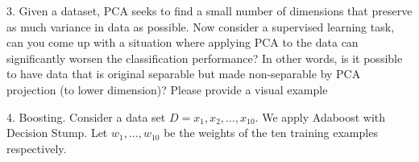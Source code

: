 \documentclass[12pt,letterpaper]{article}
\begin{document}
	\pagebreak
	\item[3.] Given a dataset, PCA seeks to find a small number of dimensions that preserve as much variance in data as possible. Now consider a supervised learning task, can you come up with a situation where applying PCA to the data can significantly worsen the classification performance? In other words, is it possible to have data that is original separable but made non-separable by PCA projection (to lower dimension)? Please provide a visual example \\[30mm]
	
	\item[4.] Boosting. Consider a data set $D = {x_{1},x_{2},\ldots,x_{10}}$. We apply Adaboost with Decision Stump. Let $w_{1}, \ldots, w_{10}$ be the weights of the ten training examples respectively. \\
\end{document}
